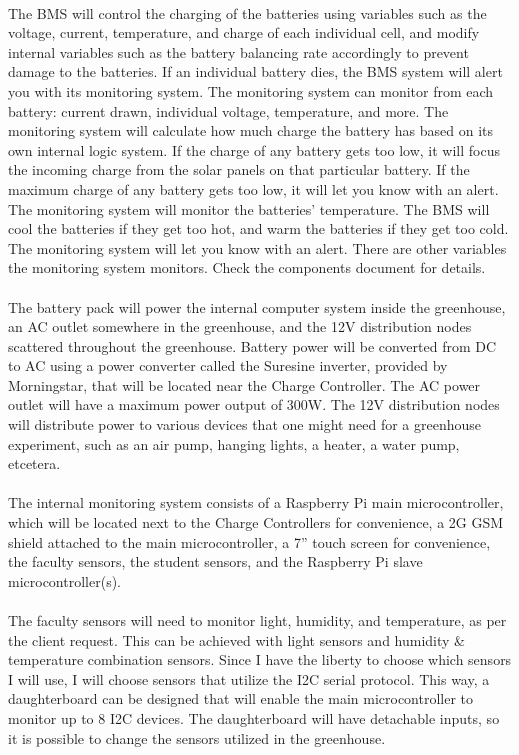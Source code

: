 \paragraph{}
The BMS will control the charging of the batteries using variables such as the voltage, current, temperature, and charge of each individual cell, and modify internal variables such as the battery balancing rate accordingly to prevent damage to the batteries. If an individual battery dies, the BMS system will alert you with its monitoring system. The monitoring system can monitor from each battery: current drawn, individual voltage, temperature, and more. The monitoring system will calculate how much charge the battery has based on its own internal logic system. If the charge of any battery gets too low, it will focus the incoming charge from the solar panels on that particular battery. If the maximum charge of any battery gets too low, it will let you know with an alert. The monitoring system will monitor the batteries’ temperature. The BMS will cool the batteries if they get too hot, and warm the batteries if they get too cold. The monitoring system will let you know with an alert. There are other variables the monitoring system monitors. Check the components document for details.
\paragraph{}
The battery pack will power the internal computer system inside the greenhouse, an AC outlet somewhere in the greenhouse, and the 12V distribution nodes scattered throughout the greenhouse. Battery power will be converted from DC to AC using a power converter called the Suresine inverter, provided by Morningstar, that will be located near the Charge Controller. The AC power outlet will have a maximum power output of 300W. The 12V distribution nodes will distribute power to various devices that one might need for a greenhouse experiment, such as an air pump, hanging lights, a heater, a water pump, etcetera.
\paragraph{}
The internal monitoring system consists of a Raspberry Pi main microcontroller, which will be located next to the Charge Controllers for convenience, a 2G GSM shield attached to the main microcontroller, a 7” touch screen for convenience, the faculty sensors, the student sensors, and the Raspberry Pi slave microcontroller(s).
\paragraph{}
The faculty sensors will need to monitor light, humidity, and temperature, as per the client request. This can be achieved with light sensors and humidity \& temperature combination sensors. Since I have the liberty to choose which sensors I will use, I will choose sensors that utilize the I2C serial protocol. This way, a daughterboard can be designed that will enable the main microcontroller to monitor up to 8 I2C devices. The daughterboard will have detachable inputs, so it is possible to change the sensors utilized in the greenhouse.
